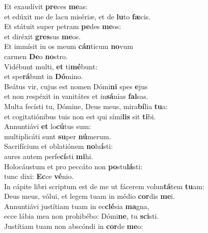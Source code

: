 \evenverse Et exaudívit \textbf{pre}ces \textbf{me}as:~\*\\
\evenverse et edúxit me de lacu misériæ, et de \textbf{lu}to \textbf{fæ}cis.\\
\oddverse Et státuit super petram \textbf{pe}des \textbf{me}os:~\*\\
\oddverse et diréxit \textbf{gres}sus \textbf{me}os.\\
\evenverse Et immísit in os meum \textbf{cán}ticum \textbf{no}vum~\*\\
\evenverse carmen \textbf{De}o \textbf{no}stro.\\
\oddverse Vidébunt multi, \textbf{et} ti\textbf{mé}bunt:~\*\\
\oddverse et spe\textbf{rá}bunt in \textbf{Dó}mino.\\
\evenverse Beátus vir, cujus est nomen Dómi\textbf{ni} spes \textbf{e}jus~\*\\
\evenverse et non respéxit in vanitátes et in\textbf{sá}nias \textbf{fal}sas.\\
\oddverse Multa fecísti tu, Dómine, Deus meus, mira\textbf{bí}lia \textbf{tu}a:~\*\\
\oddverse et cogitatiónibus tuis non est qui sími\textbf{lis} sit \textbf{ti}bi.\\
\evenverse Annuntiávi \textbf{et} lo\textbf{cú}tus sum:~\*\\
\evenverse multiplicáti sunt \textbf{su}per \textbf{nú}merum.\\
\oddverse Sacrifícium et oblatiónem \textbf{no}lu\textbf{í}sti:~\*\\
\oddverse aures autem perfe\textbf{cí}sti \textbf{mi}hi.\\
\evenverse Holocáustum et pro peccáto non \textbf{po}stu\textbf{lá}sti:~\*\\
\evenverse tunc dixi: \textbf{Ec}ce \textbf{vé}nio.\\
\oddverse In cápite libri scriptum est de me ut fácerem volun\textbf{tá}tem \textbf{tu}am:~\*\\
\oddverse Deus meus, vólui, et legem tuam in médio \textbf{cor}dis \textbf{me}i.\\
\evenverse Annuntiávi justítiam tuam in ec\textbf{clé}sia \textbf{ma}gna,~\*\\
\evenverse ecce lábia mea non prohibébo: Dómi\textbf{ne}, tu \textbf{sci}sti.\\
\oddverse Justítiam tuam non abscóndi in \textbf{cor}de \textbf{me}o:~\*\\
